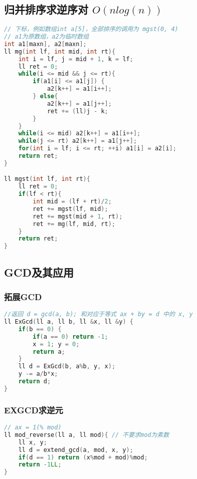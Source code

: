 \subsection{归并排序求逆序对 $O(nlog(n))$ }

\begin{lstlisting}[language=C++]
// 下标，例如数组int a[5]，全部排序的调用为 mgst(0, 4)
// a1为原数组，a2为临时数组
int a1[maxn], a2[maxn];
ll mg(int lf, int mid, int rt){
    int i = lf, j = mid + 1, k = lf;
    ll ret = 0;
    while(i <= mid && j <= rt){
        if(a1[i] <= a1[j]) {
            a2[k++] = a1[i++];
        } else{
            a2[k++] = a1[j++];
            ret += (ll)j - k;
        }
    }
    while(i <= mid) a2[k++] = a1[i++];
    while(j <= rt) a2[k++] = a1[j++];
    for(int i = lf; i <= rt; ++i) a1[i] = a2[i];
    return ret;
}

ll mgst(int lf, int rt){
    ll ret = 0;
    if(lf < rt){
        int mid = (lf + rt)/2;
        ret += mgst(lf, mid);
        ret += mgst(mid + 1, rt);
        ret += mg(lf, mid, rt);
    }
    return ret;
}        
\end{lstlisting}

\subsection{GCD及其应用}

\subsubsection{拓展GCD}

\begin{lstlisting}[language=C++]
//返回 d = gcd(a, b); 和对应于等式 ax + by = d 中的 x, y
ll ExGcd(ll a, ll b, ll &x, ll &y) {
    if(b == 0) {
        if(a == 0) return -1;
        x = 1; y = 0;
        return a;
    }
    ll d = ExGcd(b, a%b, y, x);
    y -= a/b*x;
    return d;
}
\end{lstlisting}

\subsubsection{EXGCD求逆元}

\begin{lstlisting}[language=C++]
// ax = 1(% mod)
ll mod_reverse(ll a, ll mod){ // 不要求mod为素数
    ll x, y;
    ll d = extend_gcd(a, mod, x, y);
    if(d == 1) return (x%mod + mod)%mod;
    return -1LL;
}
\end{lstlisting}

